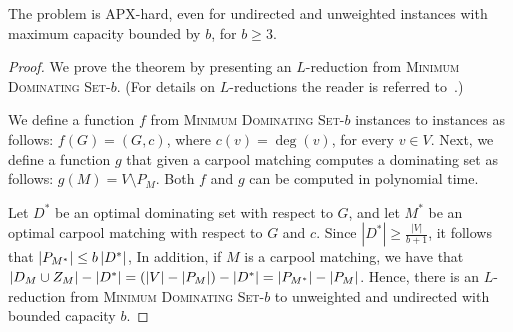 \begin{theorem}
The \carpool problem is APX-hard, even for undirected and unweighted
instances with maximum capacity bounded by $b$, for $b \geq 3$.
\end{theorem}
\begin{proof}
We prove the theorem by presenting an $L$-reduction from
\textsc{Minimum Dominating Set-$b$}.
(For details on $L$-reductions the reader is referred to~\cite{PapYan88}.)

We define a function $f$ from \textsc{Minimum Dominating Set-$b$}
instances to \carpool instances as follows: $f(G) = (G,c)$, where
$c(v) = \deg(v)$, for every $v \in V$.  Next, we define a function $g$
that given a carpool matching computes a dominating set as follows:
$g(M) = V \setminus P_{M}$.  Both $f$ and $g$ can be computed in
polynomial time.

Let $D^*$ be an optimal dominating set with respect to $G$, and let
$M^*$ be an optimal carpool matching with respect to $G$ and $c$.
Since $|D^*| \geq \frac{|V|}{b+1}$, it follows that 
\(
\left| P_{M^*} \right| \leq b \left| D^* \right|
\),
In addition, if $M$ is a carpool matching, we have that
\(
\left| D_M \cup Z_M \right| - \left| D^* \right|
= (\left| V \right| - \left| P_M \right|) - \left| D^* \right|
= \left| P_{M^*} \right| - \left| P_M \right|
\).
Hence, there is an $L$-reduction from \textsc{Minimum Dominating
Set-$b$} to unweighted and undirected \carpool with bounded capacity
$b$.
\end{proof}
